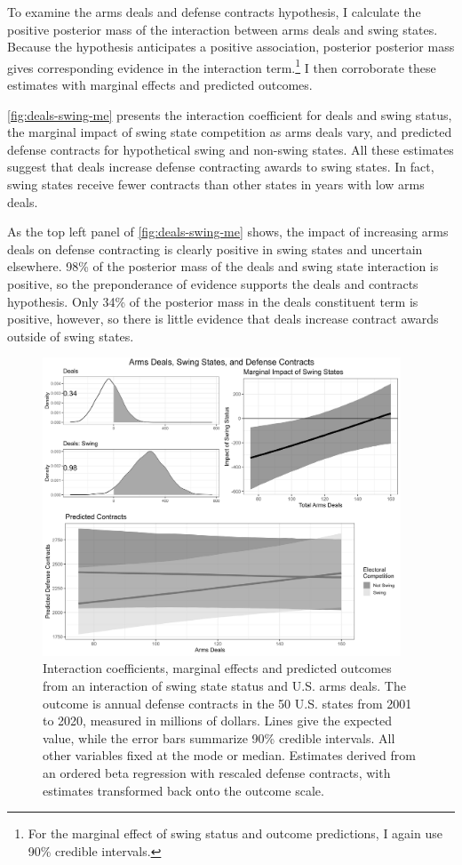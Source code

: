 \documentclass[12pt]{article}
\begin{document}
To examine the arms deals and defense contracts hypothesis, I calculate the positive posterior mass of the interaction between arms deals and swing states. Because the hypothesis anticipates a positive association, posterior posterior mass gives corresponding evidence in the interaction term.\footnote{For the marginal effect of swing status and outcome predictions, I again use 90\% credible intervals.}
I then corroborate these estimates with marginal effects and predicted outcomes.


\autoref{fig:deals-swing-me} presents the interaction coefficient for deals and swing status, the marginal impact of swing state competition as arms deals vary, and predicted defense contracts for hypothetical swing and non-swing states. 
All these estimates suggest that deals increase defense contracting awards to swing states. 
In fact, swing states receive fewer contracts than other states in years with low arms deals. 


As the top left panel of \autoref{fig:deals-swing-me} shows, the impact of increasing arms deals on defense contracting is clearly positive in swing states and uncertain elsewhere.
98\% of the posterior mass of the deals and swing state interaction is positive, so the preponderance of evidence supports the deals and contracts hypothesis.
Only 34\% of the posterior mass in the deals constituent term is positive, however, so there is little evidence that deals increase contract awards outside of swing states. 


\begin{figure}[htpb]
	\centering
		\includegraphics[width=0.95\textwidth]{../figures/deals-swing-me.png}
	\caption{Interaction coefficients, marginal effects and predicted outcomes from an interaction of swing state status and U.S. arms deals. The outcome is annual defense contracts in the 50 U.S. states from 2001 to 2020, measured in millions of dollars. Lines give the expected value, while the error bars summarize 90\% credible intervals. All other variables fixed at the mode or median. Estimates derived from an ordered beta regression with rescaled defense contracts, with estimates transformed back onto the outcome scale.}
	\label{fig:deals-swing-me}
\end{figure}
\end{document}
